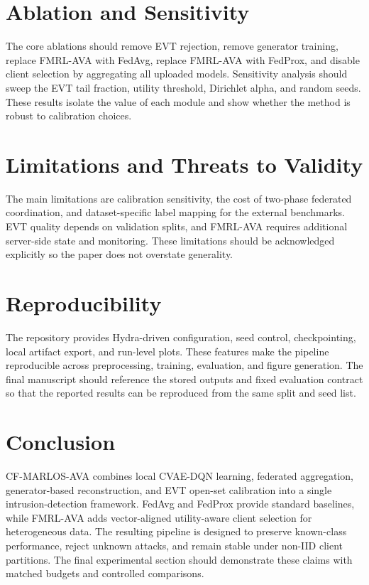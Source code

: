 \documentclass[10pt,twocolumn]{article}
\begin{document}
\section{Ablation and Sensitivity}
The core ablations should remove EVT rejection, remove generator training, replace FMRL-AVA with FedAvg, replace FMRL-AVA with FedProx, and disable client selection by aggregating all uploaded models. Sensitivity analysis should sweep the EVT tail fraction, utility threshold, Dirichlet alpha, and random seeds. These results isolate the value of each module and show whether the method is robust to calibration choices.

\section{Limitations and Threats to Validity}
The main limitations are calibration sensitivity, the cost of two-phase federated coordination, and dataset-specific label mapping for the external benchmarks. EVT quality depends on validation splits, and FMRL-AVA requires additional server-side state and monitoring. These limitations should be acknowledged explicitly so the paper does not overstate generality.

\section{Reproducibility}
The repository provides Hydra-driven configuration, seed control, checkpointing, local artifact export, and run-level plots. These features make the pipeline reproducible across preprocessing, training, evaluation, and figure generation. The final manuscript should reference the stored outputs and fixed evaluation contract so that the reported results can be reproduced from the same split and seed list.

\section{Conclusion}
CF-MARLOS-AVA combines local CVAE-DQN learning, federated aggregation, generator-based reconstruction, and EVT open-set calibration into a single intrusion-detection framework. FedAvg and FedProx provide standard baselines, while FMRL-AVA adds vector-aligned utility-aware client selection for heterogeneous data. The resulting pipeline is designed to preserve known-class performance, reject unknown attacks, and remain stable under non-IID client partitions. The final experimental section should demonstrate these claims with matched budgets and controlled comparisons.
\end{document}
